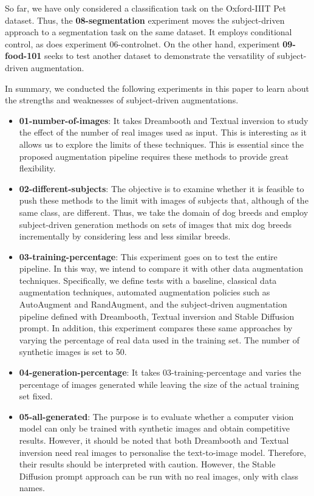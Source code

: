 So far, we have only considered a classification task on the Oxford-IIIT Pet dataset. Thus, the \textbf{08-segmentation} experiment moves the subject-driven approach to a segmentation task on the same dataset. It employs conditional control, as does experiment 06-controlnet. On the other hand, experiment \textbf{09-food-101} seeks to test another dataset to demonstrate the versatility of subject-driven augmentation.

In summary, we conducted the following experiments in this paper to learn about the strengths and weaknesses of subject-driven augmentations.

\begin{itemize}
    \item \textbf{01-number-of-images}: It takes Dreambooth and Textual inversion to study the effect of the number of real images used as input. This is interesting as it allows us to explore the limits of these techniques. This is essential since the proposed augmentation pipeline requires these methods to provide great flexibility.
    \item \textbf{02-different-subjects}: The objective is to examine whether it is feasible to push these methods to the limit with images of subjects that, although of the same class, are different. Thus, we take the domain of dog breeds and employ subject-driven generation methods on sets of images that mix dog breeds incrementally by considering less and less similar breeds.
    \item \textbf{03-training-percentage}: This experiment goes on to test the entire pipeline. In this way, we intend to compare it with other data augmentation techniques. Specifically, we define tests with a baseline, classical data augmentation techniques, automated augmentation policies such as AutoAugment and RandAugment, and the subject-driven augmentation pipeline defined with Dreambooth, Textual inversion and Stable Diffusion prompt. In addition, this experiment compares these same approaches by varying the percentage of real data used in the training set. The number of synthetic images is set to 50.
    \item \textbf{04-generation-percentage}: It takes 03-training-percentage and varies the percentage of images generated while leaving the size of the actual training set fixed.
    \item \textbf{05-all-generated}: The purpose is to evaluate whether a computer vision model can only be trained with synthetic images and obtain competitive results. However, it should be noted that both Dreambooth and Textual inversion need real images to personalise the text-to-image model. Therefore, their results should be interpreted with caution. However, the Stable Diffusion prompt approach can be run with no real images, only with class names.

\end{itemize}
